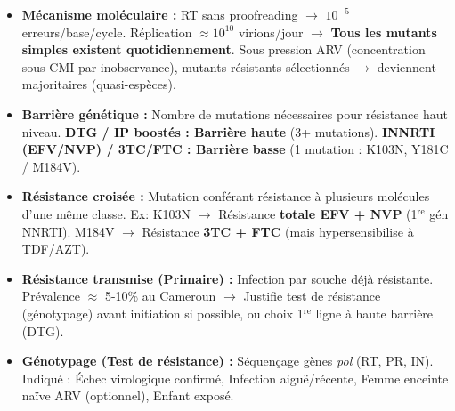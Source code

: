 \documentclass[11pt]{article}
\begin{document}
\begin{propriete}
\begin{itemize}
    \item \textbf{Mécanisme moléculaire :} RT sans proofreading $\rightarrow$ $10^{-5}$ erreurs/base/cycle. Réplication $\approx 10^{10}$ virions/jour $\rightarrow$ \textbf{Tous les mutants simples existent quotidiennement}. Sous pression ARV (concentration sous-CMI par inobservance), mutants résistants sélectionnés $\rightarrow$ deviennent majoritaires (quasi-espèces).
    \item \textbf{Barrière génétique :} Nombre de mutations nécessaires pour résistance haut niveau. \textbf{DTG / IP boostés : Barrière haute} (3+ mutations). \textbf{INNRTI (EFV/NVP) / 3TC/FTC : Barrière basse} (1 mutation : K103N, Y181C / M184V).
    \item \textbf{Résistance croisée :} Mutation conférant résistance à plusieurs molécules d'une même classe. Ex: K103N $\rightarrow$ Résistance \textbf{totale EFV + NVP} (1$^{\text{re}}$ gén NNRTI). M184V $\rightarrow$ Résistance \textbf{3TC + FTC} (mais hypersensibilise à TDF/AZT).
    \item \textbf{Résistance transmise (Primaire) :} Infection par souche déjà résistante. Prévalence $\approx$ 5-10\% au Cameroun $\rightarrow$ Justifie test de résistance (génotypage) avant initiation si possible, ou choix 1$^{\text{re}}$ ligne à haute barrière (DTG).
    \item \textbf{Génotypage (Test de résistance) :} Séquençage gènes \emph{pol} (RT, PR, IN). Indiqué : Échec virologique confirmé, Infection aiguë/récente, Femme enceinte naïve ARV (optionnel), Enfant exposé.
\end{itemize}
\end{propriete}
\end{document}
